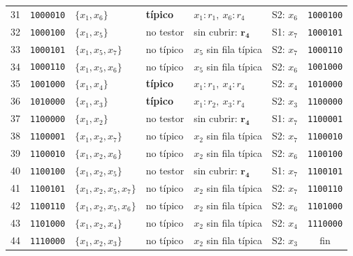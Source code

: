 \begin{tabular}{r c l l l c c}
31 & \texttt{1000010} & $\{x_{1},x_{6}\}$ & \textbf{típico} & $x_{1}{:}r_{1},\ x_{6}{:}r_{4}$ & S2: $x_{6}$ & \texttt{1000100} \\
32 & \texttt{1000100} & $\{x_{1},x_{5}\}$ & no testor & sin cubrir: $\mathbf{r}_{\mathbf{4}}$ & S1: $x_{7}$ & \texttt{1000101} \\
33 & \texttt{1000101} & $\{x_{1},x_{5},x_{7}\}$ & no típico & $x_{5}$ sin fila típica & S2: $x_{7}$ & \texttt{1000110} \\
34 & \texttt{1000110} & $\{x_{1},x_{5},x_{6}\}$ & no típico & $x_{5}$ sin fila típica & S2: $x_{6}$ & \texttt{1001000} \\
35 & \texttt{1001000} & $\{x_{1},x_{4}\}$ & \textbf{típico} & $x_{1}{:}r_{1},\ x_{4}{:}r_{4}$ & S2: $x_{4}$ & \texttt{1010000} \\
36 & \texttt{1010000} & $\{x_{1},x_{3}\}$ & \textbf{típico} & $x_{1}{:}r_{2},\ x_{3}{:}r_{4}$ & S2: $x_{3}$ & \texttt{1100000} \\
37 & \texttt{1100000} & $\{x_{1},x_{2}\}$ & no testor & sin cubrir: $\mathbf{r}_{\mathbf{4}}$ & S1: $x_{7}$ & \texttt{1100001} \\
38 & \texttt{1100001} & $\{x_{1},x_{2},x_{7}\}$ & no típico & $x_{2}$ sin fila típica & S2: $x_{7}$ & \texttt{1100010} \\
39 & \texttt{1100010} & $\{x_{1},x_{2},x_{6}\}$ & no típico & $x_{2}$ sin fila típica & S2: $x_{6}$ & \texttt{1100100} \\
40 & \texttt{1100100} & $\{x_{1},x_{2},x_{5}\}$ & no testor & sin cubrir: $\mathbf{r}_{\mathbf{4}}$ & S1: $x_{7}$ & \texttt{1100101} \\
41 & \texttt{1100101} & $\{x_{1},x_{2},x_{5},x_{7}\}$ & no típico & $x_{2}$ sin fila típica & S2: $x_{7}$ & \texttt{1100110} \\
42 & \texttt{1100110} & $\{x_{1},x_{2},x_{5},x_{6}\}$ & no típico & $x_{2}$ sin fila típica & S2: $x_{6}$ & \texttt{1101000} \\
43 & \texttt{1101000} & $\{x_{1},x_{2},x_{4}\}$ & no típico & $x_{2}$ sin fila típica & S2: $x_{4}$ & \texttt{1110000} \\
44 & \texttt{1110000} & $\{x_{1},x_{2},x_{3}\}$ & no típico & $x_{2}$ sin fila típica & S2: $x_{3}$ & fin \\
\bottomrule
\end{tabular}
